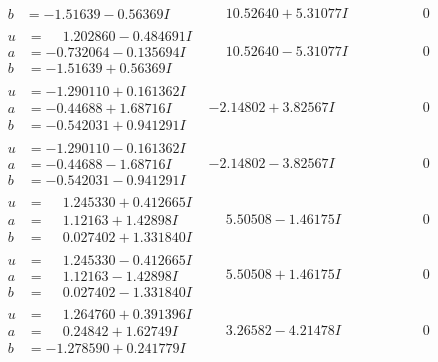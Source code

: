 \documentclass[1p]{elsarticle_modified}
\theoremstyle{definition}
\begin{document}
$$\begin{array}{c|c|c}
\begin{aligned}
b &= -1.51639 - 0.56369 I\end{aligned}
 & \phantom{-}10.52640 + 5.31077 I & \phantom{-0.000000 } 0 \\ \hline\begin{aligned}
u &= \phantom{-}1.202860 - 0.484691 I \\
a &= -0.732064 - 0.135694 I \\
b &= -1.51639 + 0.56369 I\end{aligned}
 & \phantom{-}10.52640 - 5.31077 I & \phantom{-0.000000 } 0 \\ \hline\begin{aligned}
u &= -1.290110 + 0.161362 I \\
a &= -0.44688 + 1.68716 I \\
b &= -0.542031 + 0.941291 I\end{aligned}
 & -2.14802 + 3.82567 I & \phantom{-0.000000 } 0 \\ \hline\begin{aligned}
u &= -1.290110 - 0.161362 I \\
a &= -0.44688 - 1.68716 I \\
b &= -0.542031 - 0.941291 I\end{aligned}
 & -2.14802 - 3.82567 I & \phantom{-0.000000 } 0 \\ \hline\begin{aligned}
u &= \phantom{-}1.245330 + 0.412665 I \\
a &= \phantom{-}1.12163 + 1.42898 I \\
b &= \phantom{-}0.027402 + 1.331840 I\end{aligned}
 & \phantom{-}5.50508 - 1.46175 I & \phantom{-0.000000 } 0 \\ \hline\begin{aligned}
u &= \phantom{-}1.245330 - 0.412665 I \\
a &= \phantom{-}1.12163 - 1.42898 I \\
b &= \phantom{-}0.027402 - 1.331840 I\end{aligned}
 & \phantom{-}5.50508 + 1.46175 I & \phantom{-0.000000 } 0 \\ \hline\begin{aligned}
u &= \phantom{-}1.264760 + 0.391396 I \\
a &= \phantom{-}0.24842 + 1.62749 I \\
b &= -1.278590 + 0.241779 I\end{aligned}
 & \phantom{-}3.26582 - 4.21478 I & \phantom{-0.000000 } 0 \\ \hline\begin{aligned}

\end{aligned}
\end{array}$$
\end{document}
